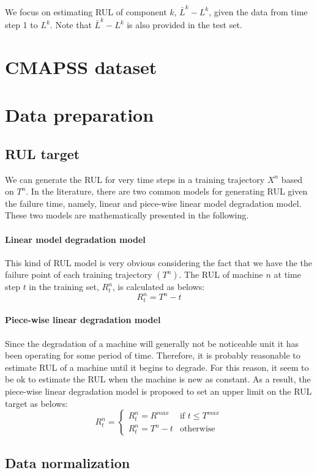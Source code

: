 \documentclass{article}
\DeclareRobustCommand{\&}{%
	\ifdim\fontdimen1\font>0pt
	\textsl{\symbol{`\&}}%
	\else
	\symbol{`\&}%
	\fi
}
\begin{document}
We focus on estimating RUL of component $k$, $\bar{L}^k - L^k$, given the data from time step 1 to $L^k$. Note that $\bar{L}^k - L^k$ is also provided in the test set.

\section{CMAPSS dataset}
\section{Data preparation}
\subsection{RUL target}
We can generate the RUL for very time steps in a training trajectory $X^n$ based on $T^n$. In the literature, there are two common models for generating RUL given the failure time, namely, linear and piece-wise linear model degradation model. These two models are mathematically presented in the following.

\paragraph{Linear model degradation model} This kind of RUL model is very obvious considering the fact that we have the the failure point of each training trajectory $(T^n)$. The RUL of machine $n$ at time step $t$ in the training set, $R_t^n$, is calculated as belows:
\begin{equation}
	R_t^n = T^n - t
\end{equation}

\paragraph{Piece-wise linear degradation model}  Since the degradation of a machine will generally not be noticeable unit it has been operating for some period of time. Therefore, it is probably reasonable to estimate RUL of a machine until it begins to degrade. For this reason, it seem to be ok to estimate the RUL when the machine is new as constant. As a result, the piece-wise linear degradation model is proposed to set an upper limit on the RUL target as belows:
\begin{equation}
	 R_t^n = 
	\begin{cases}
		R_t ^n = R^{max}  & \text{if } t \le T^{max} \\ 
		R_t^n = T^n - t   & \text{otherwise} 
	\end{cases}
\end{equation}

\subsection{Data normalization}



\printbibliography
\end{document}
